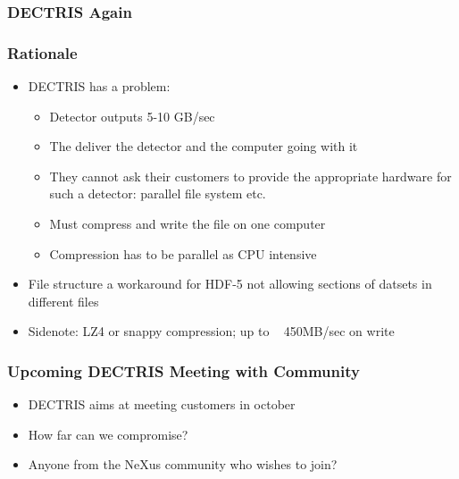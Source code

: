 \documentclass{beamer}
\begin{document}
\begin{frame} \frametitle{DECTRIS Again }
\begin{figure}[!ht]
\end{figure}
\end{frame}
\begin{frame}
\frametitle{Rationale}
\begin{itemize}
\item DECTRIS has a problem:
\begin{itemize}
\item Detector outputs 5-10 GB/sec
\item The deliver the detector and the computer going with it
\item They cannot ask their customers to provide the appropriate hardware for such 
 a detector: parallel file system etc.
\item Must compress and write the file on one computer
\item Compression has to be parallel as CPU intensive
\end{itemize}
\item File structure a workaround for HDF-5 not allowing sections of datsets in different 
 files
\item Sidenote: LZ4 or snappy compression; up to ~ 450MB/sec on write
\end{itemize}
\end{frame}


\begin{frame}
\frametitle{Upcoming DECTRIS Meeting with Community}
\begin{itemize}
\item DECTRIS aims at meeting customers in october
\item How far can we compromise?
\item Anyone from the NeXus community who wishes to join?
\end{itemize}
\end{frame}
\end{document}
